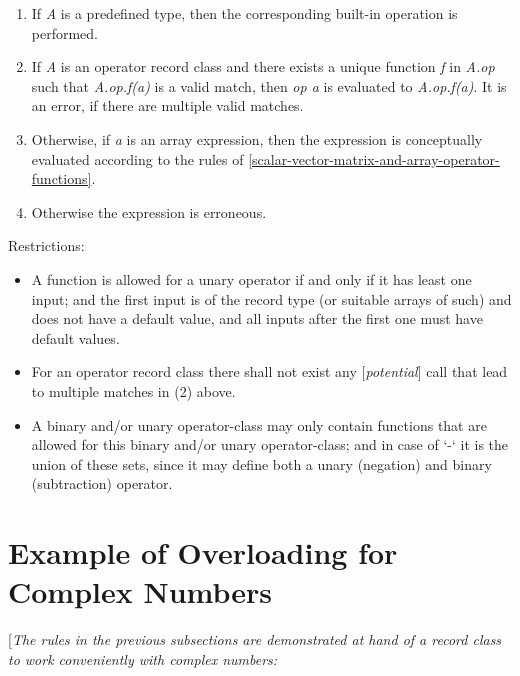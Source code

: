 \documentclass[10pt,a4paper]{report}
\def\doublelabel#1{\label{#1}}
\renewcommand{\labelenumi}{\arabic{enumi}.}
\begin{document}
\begin{enumerate}
\def\labelenumi{\arabic{enumi}.}
\item
  If \emph{A} is a {predefined type}, then the corresponding built-in
  operation is performed.
\item
  If \emph{A} is an {operator record class} and there exists a {unique}
  function \emph{f} in \emph{A.op} such that \emph{A.op.f(a)} is a valid
  match, then \emph{op a} is evaluated to \emph{A.op.f(a)}. It is an
  error, if there are multiple valid matches.
\item
  Otherwise, if \emph{a} is an {array expression}, then the expression
  is conceptually evaluated according to the rules of \ref{scalar-vector-matrix-and-array-operator-functions}.
\item
  Otherwise the expression is erroneous.
\end{enumerate}

Restrictions:

\begin{itemize}
\item
  A function is allowed for a unary operator if and only if it has least
  one input; and the first input is of the record type (or suitable
  arrays of such) and does not have a default value, and all inputs
  after the first one must have default values.
\item
  For an operator record class there shall not exist {any}
  {[}\emph{potential}{]} call that lead to multiple matches in (2)
  above.
\item
  A binary and/or unary operator-class may only contain functions that
  are allowed for this binary and/or unary operator-class; and in case
  of `-` it is the union of these sets, since it may define both a unary
  (negation) and binary (subtraction) operator.
\end{itemize}

\section{Example of Overloading for Complex Numbers}\doublelabel{example-of-overloading-for-complex-numbers}

{[}\emph{The rules in the previous subsections are demonstrated at hand
of a record class to work conveniently with complex numbers:}
\end{document}
